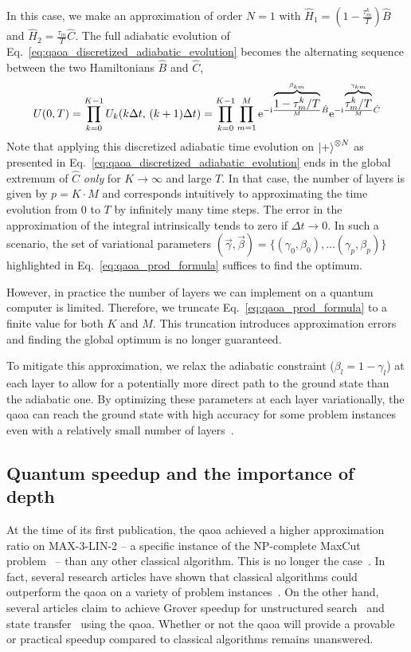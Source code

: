 In this case, we make an approximation of order $N=1$ with $\hat H_1 = (1-\frac{\tau_m^k}{T})\hat B$ and $\hat H_2 = \frac{\tau_m}{T} \hat C$. The full adiabatic evolution of Eq.~\eqref{eq:qaoa_discretized_adiabatic_evolution} becomes the alternating sequence between the two Hamiltonians $\hat B$ and $\hat C$,
\begin{equation} \label{eq:qaoa_prod_formula}
    U(0,T) = \prod_{k=0}^{K-1} U_k(k\Delta t, \,(k+1)\Delta t)= \prod_{k=0}^{K-1}\prod_{m=1}^M \mathrm e^{-\mathrm i\frac{ \overbrace{1-\tau_m^k/T}^{\beta_{km}}}{M}\hat B}\mathrm e^{-\mathrm i\frac{\overbrace{\tau_m^k/T}^{\gamma_{km}}}{M}\hat C}
\end{equation}
Note that applying this discretized adiabatic time evolution on $\ket{+}^{\otimes N}$ as presented in Eq.~\eqref{eq:qaoa_discretized_adiabatic_evolution} ends in the global extremum of $\hat C$ \textit{only} for $K \rightarrow \infty$ and large $T$. In that case, the number of layers is given by $p = K\cdot M$ and corresponds intuitively to approximating the time evolution from 0 to $T$ by infinitely many time steps. The error in the approximation of the integral intrinsically tends to zero if $\Delta t \rightarrow 0$. In such a scenario, the  set of variational parameters $(\vec\gamma, \vec\beta) = \{(\gamma_0, \beta_0), ... (\gamma_p, \beta_p)\}$ highlighted in Eq.~\eqref{eq:qaoa_prod_formula} suffices to find the optimum. 

However, in practice the number of layers we can implement on a quantum computer is limited. Therefore, we truncate Eq.~\eqref{eq:qaoa_prod_formula} to a finite value for both $K$ and $M$. This truncation introduces approximation errors and finding the global optimum is no longer guaranteed. 

To mitigate this approximation, we relax the adiabatic constraint ($\beta_l = 1 - \gamma_l$) at each layer to allow for a potentially more direct path to the ground state than the adiabatic one. By optimizing these parameters at each layer variationally, the \gls{qaoa} can reach the ground state with high accuracy for some problem instances even with a relatively small number of layers~\cite{Moll2017QuantumDevices}. 

\subsection{Quantum speedup and the importance of depth}
At the time of its first publication, the \gls{qaoa} achieved a higher approximation ratio on MAX-3-LIN-2 -- a specific instance of the NP-complete MaxCut problem~\cite{GareyM1990} -- than any other classical algorithm. This is no longer the case~\cite{Barak2015BeatingDegree, Hastings2019CLASSICALALGORITHMS}. In fact, several research articles have shown that classical algorithms could outperform the \gls{qaoa} on a variety of problem instances~\cite{Barak2015BeatingDegree, Hastings2019CLASSICALALGORITHMS, Bravyi2019ObstaclesProtection}. On the other hand, several articles claim to achieve Grover speedup for unstructured search~\cite{Jiang2017Near-optimalField} and state transfer~\cite{Niu2019OptimizingDepth} using the \gls{qaoa}. Whether or not the \gls{qaoa} will provide a provable or practical speedup compared to classical algorithms remains unanswered. 

